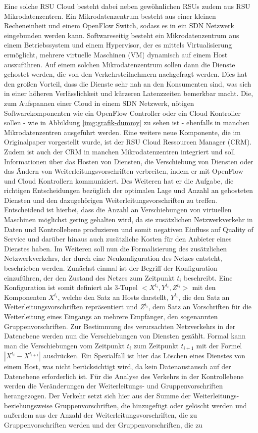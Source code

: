 \documentclass[conference]{IEEEtran}
\begin{document}
Eine solche RSU Cloud besteht dabei neben gewöhnlichen RSUs zudem aus RSU Mikrodatenzentren. Ein Mikrodatenzentrum besteht aus einer kleinen Recheneinheit und einem OpenFlow Switch, sodass es in ein SDN Netzwerk eingebunden werden kann. Softwareseitig besteht ein Mikrodatenzentrum aus einem Betriebssystem und einem Hypervisor, der es mittels Virtualisierung ermöglicht, mehrere virtuelle Maschinen (VM) dynamisch auf einem Host auszuführen. Auf einem solchen Mikrodatenzentrum sollen dann die Dienste gehostet werden, die von den Verkehrsteilnehmern nachgefragt werden. Dies hat den großen Vorteil, dass die Dienste sehr \glqq nah\grqq{} an den Konsumenten sind, was sich in einer höheren Verlässlichkeit und kürzeren Latenzzeiten bemerkbar macht. Die, zum Aufspannen einer Cloud in einem SDN Netzwerk, nötigen Softwarekomponenten wie ein OpenFlow Controller oder ein Cloud Kontroller sollen - wie in Abbildung \ref{img:grafik-dummy} zu sehen ist - ebenfalls in manchen Mikrodatenzentren ausgeführt werden. Eine weitere neue Komponente, die im Originalpaper vorgestellt wurde, ist der RSU Cloud Ressourcen Manager (CRM). Zudem ist auch der CRM in manchen Mikrodatenzentren integriert und soll Informationen über das Hosten von Diensten, die Verschiebung von Diensten oder das Ändern von Weiterleitungsvorschriften verbreiten, indem er mit OpenFlow und Cloud Kontrollern kommuniziert. Des Weiteren hat er die Aufgabe, die richtigen Entscheidungen bezüglich der optimalen Lage und Anzahl an gehosteten Diensten und den dazugehörigen Weiterleitungsvorschriften zu treffen. Entscheidend ist hierbei, dass die Anzahl an Verschiebungen von virtuellen Maschinen möglichst gering gehalten wird, da sie zusätzlichen Netzwerkverkehr in Daten und Kontrollebene produzieren und somit negativen Einfluss auf Quality of Service und darüber hinaus auch zusätzliche Kosten für den Anbieter eines Dienstes haben. Im Weiteren soll nun die Formalisierung des zusätzlichen Netzwerkverkehrs, der durch eine Neukonfiguration des Netzes entsteht, beschrieben werden. Zunächst einmal ist der Begriff der Konfiguration einzuführen, der den Zustand des Netzes zum Zeitpunkt \(t_i\) beschreibt. Eine Konfiguration ist somit definiert als 3-Tupel \(<X^{t_i},Y^{t_i},Z^{t_i}>\) mit den Komponenten $X^{t_i}$, welche den Satz an Hosts darstellt, \(Y^{t_i}\), die den Satz an Weiterleitungsvorschriften repräsentiert und \(Z^{t_i}\),  dem Satz an Vorschriften für die Weiterleitung eines Eingangs an mehrere Empfänger, den sogenannten Gruppenvorschriften. Zur Bestimmung des verursachten Netzverkehrs in der Datenebene werden nun die Verschiebungen von Diensten gezählt. Formal kann man die Verschiebungen vom Zeitpunkt \(t_i\) zum Zeitpunkt \(t_{i+1}\) mit der Formel \(|X^{t_i}-X^{t_{i+1}}|\) ausdrücken. Ein Spezialfall ist hier das Löschen eines Dienstes von einem Host, was nicht berücksichtigt wird, da kein Datenaustausch auf der Datenebene erforderlich ist. Für die Analyse des Verkehrs in der Kontrollebene werden die Veränderungen der Weiterleitungs- und Gruppenvorschriften herangezogen. Der Verkehr setzt sich hier aus der Summe der Weiterleitungs- beziehungsweise Gruppenvorschriften, die hinzugefügt oder gelöscht werden und außerdem aus der Anzahl der Weiterleitungsvorschriften, die zu Gruppenvorschriften werden und der Gruppenvorschriften, die zu 
\end{document}
